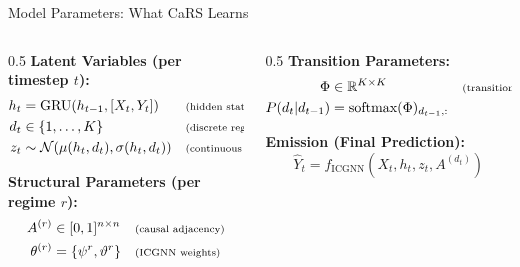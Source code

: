 \documentclass[aspectratio=169]{beamer}
\begin{document}
\begin{frame}{Model Parameters: What CaRS Learns}
\begin{columns}
\begin{column}{0.5\textwidth}
\textbf{Latent Variables (per timestep $t$):}
\begin{align*}
h_t &= \text{GRU}(h_{t-1}, [X_t, Y_t]) && \text{\scriptsize (hidden state)}\\
d_t &\in \{1, \ldots, K\} && \text{\scriptsize (discrete regime)}\\
z_t &\sim \mathcal{N}(\mu(h_t, d_t), \sigma(h_t, d_t)) && \text{\scriptsize (continuous latent)}
\end{align*}

\vspace{0.2cm}
\textbf{Structural Parameters (per regime $r$):}
\begin{align*}
A^{(r)} &\in [0,1]^{n \times n} && \text{\scriptsize (causal adjacency)}\\
\theta^{(r)} &= \{\psi^r, \vartheta^r\} && \text{\scriptsize (ICGNN weights)}
\end{align*}
\end{column}

\begin{column}{0.5\textwidth}
\textbf{Transition Parameters:}
\begin{align*}
\Phi &\in \mathbb{R}^{K \times K} && \text{\scriptsize (transition logits)}\\
P(d_t | d_{t-1}) &= \text{softmax}(\Phi)_{d_{t-1},:}
\end{align*}

\vspace{0.2cm}
\textbf{Emission (Final Prediction):}
\begin{equation*}
\hat{Y}_t = f_{\text{ICGNN}}(X_t, h_t, z_t, A^{(d_t)})
\end{equation*}

\vspace{0.3cm}
\begin{center}
\end{center}
\end{column}
\end{columns}
\end{frame}
\end{document}
